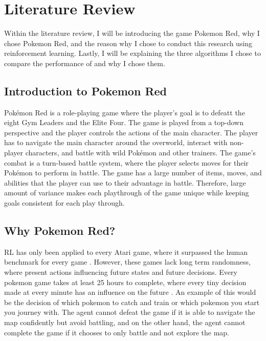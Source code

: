 \section{Literature Review}

Within the literature review, I will be introducing the game Pokemon Red, why I chose Pokemon Red, and the reason why I chose to conduct this research using reinforcement learning. Lastly, I will be explaining the three algorithms I chose to compare the performance of and why I chose them.

\subsection{Introduction to Pokemon Red}

Pokémon Red is a role-playing game where the player's goal is to defeatt the eight Gym Leaders and the Elite Four. The game is played from a top-down perspective and the player controls the actions of the main character. The player has to navigate the main character around the overworld, interact with non-player characters, and battle with wild Pokémon and other trainers. The game's combat is a turn-based battle system, where the player selects moves for their Pokémon to perform in battle. The game has a large number of items, moves, and abilities that the player can use to their advantage in battle. Therefore, large amount of variance makes each playthrough of the game unique while keeping goals consistent for each play through.

\subsection{Why Pokemon Red?}

RL has only been applied to every Atari game, where it surpassed the human benchmark for every game \cite{brockman2016openai}. However, these games lack long term randomness, where present actions influencing future states and future decisions. Every pokemon game takes at least 25 hours to complete, where every tiny decision made at every minute has an influence on the future \cite{howlongtobeat}. An example of this would be the decision of which pokemon to catch and train or which pokemon you start you journey with. The agent cannot defeat the game if it is able to navigate the map confidently but avoid battling, and on the other hand, the agent cannot complete the game if it chooses to only battle and not explore the map.
 
